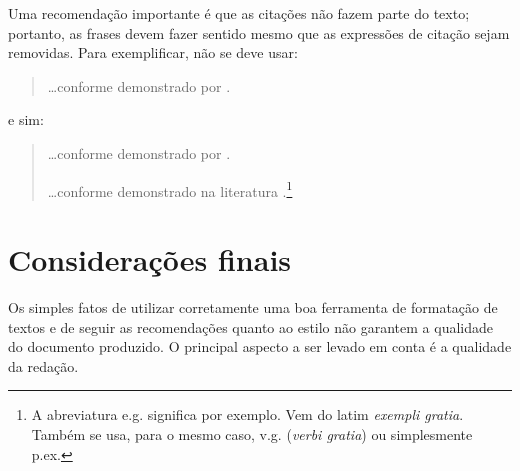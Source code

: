 Uma recomendação importante é que as citações não fazem parte do
texto; portanto, as frases devem fazer sentido mesmo que as expressões
de citação sejam removidas. Para exemplificar, não se deve usar:
\begin{quotation}
\dots conforme demonstrado por \cite{art-solimaes03}.
\end{quotation}
e sim:
\begin{quotation}
\dots conforme demonstrado por .

\dots conforme demonstrado na literatura
\cite[e.g. ]{art-solimaes03}.\footnote{A abreviatura e.g.
significa por exemplo. Vem do latim \emph{exempli gratia}. Também se
usa, para o mesmo caso, v.g. (\emph{verbi gratia}) ou simplesmente
p.ex.}
\end{quotation}

\section{Considerações finais}

Os simples fatos de utilizar corretamente uma boa ferramenta de
formatação de textos e de seguir as recomendações quanto ao estilo
não garantem a qualidade do documento produzido. O principal
aspecto a ser levado em conta é a qualidade da redação.

